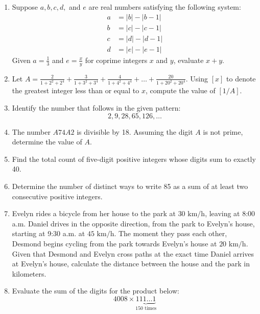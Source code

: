 \documentclass[12pt]{scrartcl}
\begin{document}
\begin{enumerate}
    \item Suppose $a, b, c, d,$ and $e$ are real numbers satisfying the following system:
    \begin{align*}
        a &= |b| - |b-1| \\
        b &= |c| - |c-1| \\
        c &= |d| - |d-1| \\
        d &= |e| - |e-1|
    \end{align*}
    Given $a = \frac{1}{3}$ and $e = \frac{x}{y}$ for coprime integers $x$ and $y$, evaluate $x+y$.

    \item Let $A = \frac{2}{1+2^2+2^4} + \frac{3}{1+3^2+3^4} + \frac{4}{1+4^2+4^4} + \dots + \frac{20}{1+20^2+20^4}$. Using $[x]$ to denote the greatest integer less than or equal to $x$, compute the value of $[1/A]$.

    \item Identify the number that follows in the given pattern:
    \[ 2, 9, 28, 65, 126, \dots \]

    \item The number $A74A2$ is divisible by 18. Assuming the digit $A$ is not prime, determine the value of $A$.

    \item Find the total count of five-digit positive integers whose digits sum to exactly 40.

    \item Determine the number of distinct ways to write 85 as a sum of at least two consecutive positive integers.

    \item Evelyn rides a bicycle from her house to the park at $30\text{ km/h}$, leaving at 8:00 a.m. Daniel drives in the opposite direction, from the park to Evelyn's house, starting at 9:30 a.m. at $45\text{ km/h}$. The moment they pass each other, Desmond begins cycling from the park towards Evelyn's house at $20\text{ km/h}$. Given that Desmond and Evelyn cross paths at the exact time Daniel arrives at Evelyn's house, calculate the distance between the house and the park in kilometers.

    \item Evaluate the sum of the digits for the product below:
    \[ 4008 \times \underbrace{111\dots1}_{150 \text{ times}} \]


\end{enumerate}
\end{document}
